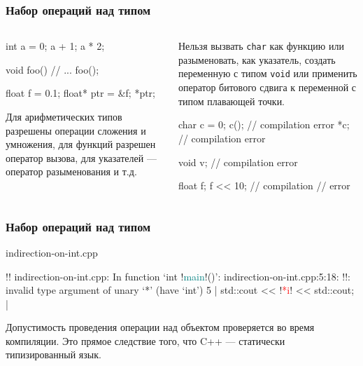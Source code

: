 \documentclass[compress, 8pt]{beamer}
\begin{document}
\begin{frame}[fragile]

    \frametitle{Набор операций над типом}

    \begin{columns}[T]

        \begin{column}{0.5\textwidth}

            \begin{myinplacelisting}[minted language=cpp]
int a = 0;
a + 1;
a * 2;

void foo() {}
// ...
foo();

float f = 0.1;
float* ptr = &f;
*ptr;
            \end{myinplacelisting}

            Для арифметических типов разрешены операции сложения
            и умножения, для функций разрешен оператор вызова,
            для указателей --- оператор разыменования и т.д.

        \end{column}

        \begin{column}{0.5\textwidth}

            Нельзя вызвать \verb|char| как функцию или разыменовать, как
            указатель, создать переменную с типом \verb|void| или
            применить оператор битового сдвига к переменной с типом
            плавающей точки.

            \begin{myinplacelisting}[minted language=cpp]
char c = 0;
c(); // compilation error
*c;  // compilation error

void v; // compilation error

float f;
f << 10; // compilation
         // error
            \end{myinplacelisting}

        \end{column}

    \end{columns}

\end{frame}

\begin{frame}[fragile]

    \frametitle{Набор операций над типом}

        {indirection-on-int.cpp}

    \begin{terminalwindow}
!!
indirection-on-int.cpp: In function ‘int !\textcolor{teal}{main}!()’:
indirection-on-int.cpp:5:18: !\color{red}{error}!: invalid type argument of unary ‘*’ (have ‘int’)
    5 |     std::cout << !\textcolor{red}{*i}! << std::cout;
      |
    \end{terminalwindow}

    Допустимость проведения операции над объектом проверяется во время
    компиляции. Это прямое следствие того, что C++ --- статически
    типизированный язык.

\end{frame}
\end{document}
